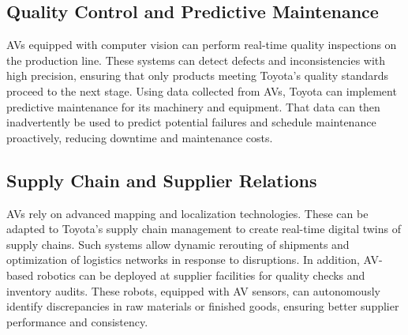 \subsection{Quality Control and Predictive Maintenance}
AVs equipped with computer vision can perform real-time quality inspections on the production line. These systems can detect defects and inconsistencies with high precision, ensuring that only products meeting Toyota's quality standards proceed to the next stage. Using data collected from AVs, Toyota can implement predictive maintenance for its machinery and equipment. That data can then inadvertently be used to predict potential failures and schedule maintenance proactively, reducing downtime and maintenance costs.

\subsection{Supply Chain and Supplier Relations}
AVs rely on advanced mapping and localization technologies. These can be adapted to Toyota's supply chain management to create real-time digital twins of supply chains. Such systems allow dynamic rerouting of shipments and optimization of logistics networks in response to disruptions. In addition, AV-based robotics can be deployed at supplier facilities for quality checks and inventory audits. These robots, equipped with AV sensors, can autonomously identify discrepancies in raw materials or finished goods, ensuring better supplier performance and consistency.